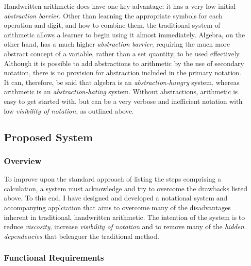 \documentclass[12pt,twoside,notitlepage,xetex]{report}
\begin{document}
Handwritten arithmetic does have one key advantage: it has a very low initial \emph{abstraction barrier}.  Other than learning the appropriate symbols for each operation and digit, and how to combine them, the traditional system of arithmetic allows a learner to begin using it almost immediately.  Algebra, on the other hand, has a much higher \emph{abstraction barrier}, requiring the much more abstract concept of a variable, rather than a set quantity, to be used effectively.  Although it is possible to add abstractions to arithmetic by the use of secondary notation, there is no provision for abstraction included in the primary notation.  It can, therefore, be said that algebra is an \emph{abstraction-hungry} system, whereas arithmetic is an \emph{abstraction-hating} system.  Without abstractions, arithmetic is easy to get started with, but can be a very verbose and inefficient notation with low \emph{visibility of notation}, as outlined above.

\subsection{Proposed System}

\subsubsection{Overview}


To improve upon the standard approach of listing the steps comprising a calculation, a system must acknowledge and try to overcome the drawbacks listed above.  To this end, I have designed and developed a notational system and accompanying applciation that aims to overcome many of the disadvantages inherent in traditional, handwritten arithmetic.  The intention of the system is to reduce \emph{viscosity}, increase \emph{visibility of notation} and to remove many of the \emph{hidden dependencies} that beleaguer the traditional method.

\subsubsection{Functional Requirements}
\end{document}
